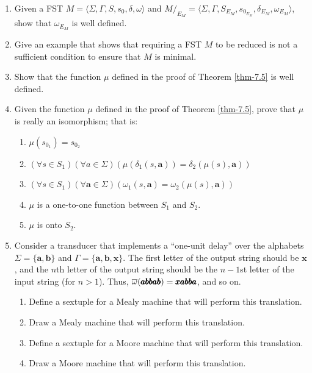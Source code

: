 \begin{enumerate}[{7.}1.]
\item Given a FST $M=\langle\Sigma,\Gamma,S,s_0,\delta,\omega\rangle$ and
$M/  _{E_M}=\langle\Sigma,\Gamma,S_{E_M},s_{0_{E_M}},\delta_{E_M},\omega_{E_M}
\rangle$, show that $\omega_{E_M}$ is well defined.

\item Give an example that shows that requiring a FST $M$ to be reduced is not a
sufficient condition to ensure that $M$ is minimal.

\item Show that the function $\mu$ defined in the proof of Theorem \ref{thm-7.5} is well
defined.

\item Given the function $\mu$ defined in the proof of Theorem \ref{thm-7.5}, prove that
$\mu$ is really an isomorphism; that is:
\begin{enumerate}
\item $\mu(s_{0_1}) = s_{0_2}$
\item $(\forall s \in S_1)(\forall a \in \Sigma)(\mu(\delta_1(s,\pmb{a})) =
	\delta_2(\mu(s),\pmb{a}))$
\item $(\forall s \in S_1)(\forall\pmb{a}\in\Sigma)(\omega_1(s,\pmb{a}) =
	\omega_2(\mu(s),\pmb{a}))$
\item $\mu$ is a one-to-one function between $S_1$ and $S_2$.
\item $\mu$ is onto $S_2$.
\end{enumerate}

\item Consider a transducer that implements a ``one-unit delay'' over the
alphabets $\Sigma=\{\pmb{a},\pmb{b}\}$ and $\Gamma=\{\pmb{a},\pmb{b},\pmb{x}\}$.
The first letter of the output string should be $\pmb{x}$, and the $n$th letter of
the output string should be the $n - 1$st letter of the input string (for
$n>1$). Thus, $\overline{\omega}(\pmb{abbab})=\pmb{xabba}$, and so on.
\begin{enumerate}
\item Define a sextuple for a Mealy machine that will perform this translation.
\item Draw a Mealy machine that will perform this translation.
\item Define a sextuple for a Moore machine that will perform this translation.
\item Draw a Moore machine that will perform this translation.
\end{enumerate}


\end{enumerate}
